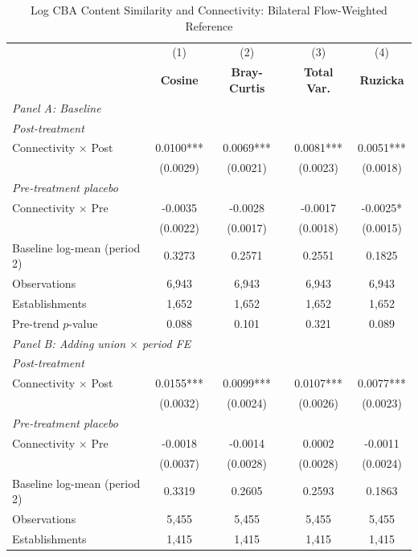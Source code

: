 \begin{table}[H]
\centering
\caption{Log CBA Content Similarity and Connectivity: Bilateral Flow-Weighted Reference}
\scriptsize
\setlength{\tabcolsep}{8pt}
\begin{tabular}{lcccc}
\hline\hline
 & (1) & (2) & (3) & (4) \\
 & \textbf{Cosine} & \textbf{Bray-Curtis} & \textbf{Total Var.} & \textbf{Ruzicka} \\
\hline
\multicolumn{5}{l}{\textit{Panel A: Baseline}} \\
\multicolumn{5}{l}{\textit{Post-treatment}} \\
Connectivity $\times$ Post & 0.0100*** & 0.0069*** & 0.0081*** & 0.0051*** \\
 & (0.0029) & (0.0021) & (0.0023) & (0.0018) \\
\multicolumn{5}{l}{\textit{Pre-treatment placebo}} \\
Connectivity $\times$ Pre & -0.0035 & -0.0028 & -0.0017 & -0.0025* \\
 & (0.0022) & (0.0017) & (0.0018) & (0.0015) \\
\hline
Baseline log-mean (period 2) & 0.3273 & 0.2571 & 0.2551 & 0.1825 \\
Observations &        6,943 &        6,943 &        6,943 &        6,943 \\
Establishments &        1,652 &        1,652 &        1,652 &        1,652 \\
Pre-trend $p$-value & 0.088 & 0.101 & 0.321 & 0.089 \\
\hline
\multicolumn{5}{l}{\textit{Panel B: Adding union $\times$ period FE}} \\
\multicolumn{5}{l}{\textit{Post-treatment}} \\
Connectivity $\times$ Post & 0.0155*** & 0.0099*** & 0.0107*** & 0.0077*** \\
 & (0.0032) & (0.0024) & (0.0026) & (0.0023) \\
\multicolumn{5}{l}{\textit{Pre-treatment placebo}} \\
Connectivity $\times$ Pre & -0.0018 & -0.0014 & 0.0002 & -0.0011 \\
 & (0.0037) & (0.0028) & (0.0028) & (0.0024) \\
\hline
Baseline log-mean (period 2) & 0.3319 & 0.2605 & 0.2593 & 0.1863 \\
Observations &        5,455 &        5,455 &        5,455 &        5,455 \\
Establishments &        1,415 &        1,415 &        1,415 &        1,415 \\

\end{tabular}
\end{table}
